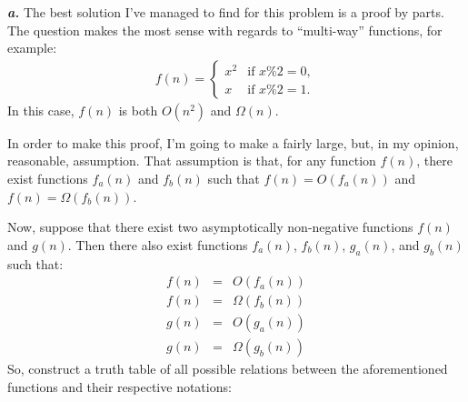 \noindent\textbf{\textit{a.}} The best solution I've managed to find for this problem is a proof by parts. The question makes the most sense with regards to ``multi-way'' functions, for example:
\begin{eqnarray*}
	f(n) =
	\begin{cases}
		x^2 & \text{if } x \% 2 = 0,\\
		x & \text{if } x \%2 = 1.
	\end{cases}
\end{eqnarray*}
In this case, $f(n)$ is both $O(n^2)$ and $\Omega(n)$.

In order to make this proof, I'm going to make a fairly large, but, in my opinion, reasonable, assumption. That assumption is that, for any function $f(n)$, there exist functions $f_a(n)$ and $f_b(n)$ such that $f(n) = O(f_a(n))$ and $f(n) = \Omega(f_b(n))$.

Now, suppose that there exist two asymptotically non-negative functions $f(n)$ and $g(n)$. Then there also exist functions $f_a(n)$, $f_b(n)$, $g_a(n)$, and $g_b(n)$ such that:
\begin{eqnarray*}
	f(n) & = & O(f_a(n)) \\
	f(n) & = & \Omega(f_b(n)) \\
	g(n) & = & O(g_a(n)) \\
	g(n) & = & \Omega(g_b(n))
\end{eqnarray*}
So, construct a truth table of all possible relations between the aforementioned functions and their respective notations:


